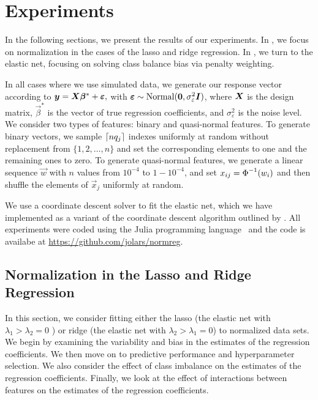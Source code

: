 \section{Experiments}\label{sec:experiments}

In the following sections, we present the results of our experiments. In
, we focus on normalization in the cases of the lasso and
ridge regression. In , we turn to the elastic net,
focusing on solving class balance bias via penalty weighting.

In all cases where we use simulated data, we generate our response vector according to
\(\boldsymbol{y} = \boldsymbol{X}\boldsymbol{\beta}^* + \boldsymbol{\varepsilon},\) with \(\boldsymbol{\varepsilon} \sim
\operatorname{Normal}(\boldsymbol{0}, \sigma_\varepsilon^2 \boldsymbol{I})\), where \(\boldsymbol{X}\) is the design matrix,
\(\vec{\beta}^*\) is the vector of true regression coefficients, and
\(\sigma_\varepsilon^2\) is the noise level. We consider two types of features: binary and
quasi-normal features. To generate binary vectors, we sample \(\lceil nq_j \rceil\) indexes
uniformly at random without replacement from \(\{1,2,\dots,n\}\) and set the corresponding
elements to one and the remaining ones to zero. To generate quasi-normal features, we
generate a linear sequence \(\vec{w}\) with \(n\) values from \(10^{-4}\) to \(1 -
10^{-4}\), and set \(x_{ij} = \operatorname{\Phi}^{-1}(w_i)\) and then shuffle the elements of
\(\vec{x}_j\) uniformly at random.

We use a coordinate descent solver to fit the elastic net, which we have implemented as a
variant of the coordinate descent algorithm outlined by \citet{friedman2010}. All
experiments were coded using the Julia programming language~\citep{bezanson2017} and the
code is availabe at \url{https://github.com/jolars/normreg}.

\subsection{Normalization in the Lasso and Ridge Regression}\label{sec:experiments-lassoridge}

In this section, we consider fitting either the lasso (the elastic net with \(\lambda_1 >
\lambda_2 = 0\) ) or ridge (the elastic net with \(\lambda_2 > \lambda_1 = 0\)) to
normalized data sets. We begin by examining the variability and bias in the estimates of
the regression coefficients. We then move on to predictive performance and hyperparameter
selection. We also consider the effect of class imbalance on the estimates of the
regression coefficients. Finally, we look at the effect of interactions between features on
the estimates of the regression coefficients.

